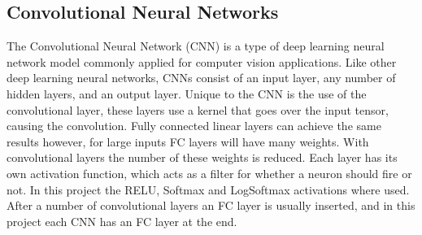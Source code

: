 \subsection{Convolutional Neural Networks}
The Convolutional Neural Network (CNN) is a type of deep learning neural network model commonly applied for computer vision applications.
Like other deep learning neural networks, CNNs consist of an input layer, any number of hidden layers, and an output layer.
Unique to the CNN is the use of the convolutional layer, these layers use a kernel that goes over the input tensor, causing the convolution.
Fully connected linear layers can achieve the same results however, for large inputs FC layers will have many weights.
With convolutional layers the number of these weights is reduced.
Each layer has its own activation function, which acts as a filter for whether a neuron should fire or not.
In this project the RELU, Softmax and LogSoftmax activations where used.
After a number of convolutional layers an FC layer is usually inserted, and in this project each CNN has an FC layer at the end.
